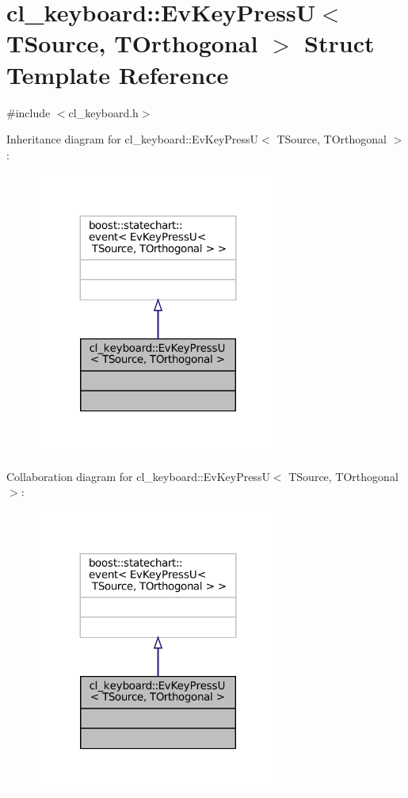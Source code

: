 \hypertarget{structcl__keyboard_1_1EvKeyPressU}{}\section{cl\+\_\+keyboard\+:\+:Ev\+Key\+PressU$<$ T\+Source, T\+Orthogonal $>$ Struct Template Reference}
\label{structcl__keyboard_1_1EvKeyPressU}


{\ttfamily \#include $<$cl\+\_\+keyboard.\+h$>$}



Inheritance diagram for cl\+\_\+keyboard\+:\+:Ev\+Key\+PressU$<$ T\+Source, T\+Orthogonal $>$\+:
\nopagebreak
\begin{figure}[H]
\begin{center}
\leavevmode
\includegraphics[width=227pt]{structcl__keyboard_1_1EvKeyPressU__inherit__graph}
\end{center}
\end{figure}


Collaboration diagram for cl\+\_\+keyboard\+:\+:Ev\+Key\+PressU$<$ T\+Source, T\+Orthogonal $>$\+:
\nopagebreak
\begin{figure}[H]
\begin{center}
\leavevmode
\includegraphics[width=227pt]{structcl__keyboard_1_1EvKeyPressU__coll__graph}
\end{center}
\end{figure}


